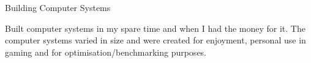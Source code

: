 \begin{cventries}
  \cventry
    {}
    {Building Computer Systems}
    {}
    {}
    {
    \vspace{-10pt}
      \begin{cvitems}
        \item {Built computer systems in my spare time and when I had the money for it. The computer systems varied in size and were created for enjoyment, personal use in gaming and for optimisation/benchmarking purposes.}
      \end{cvitems}
    }
\end{cventries}
\vspace{-5pt}